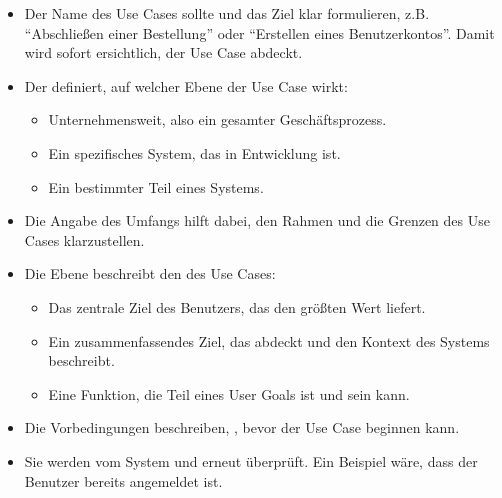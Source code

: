 \begin{infoBox}[title=Use Case Name]
    \begin{itemize}
        \item Der Name des Use Cases sollte  und das Ziel klar formulieren, z.B. \enquote{Abschließen einer Bestellung} oder \enquote{Erstellen eines Benutzerkontos}. Damit wird sofort ersichtlich,  der Use Case abdeckt.
    \end{itemize}
\end{infoBox}
\begin{infoBox}[title=Scope(Umfang)]
    \begin{itemize}
        \item Der  definiert, auf welcher Ebene der Use Case wirkt:
        \begin{itemize}
            \item {} Unternehmensweit, also ein gesamter Geschäftsprozess.
            \item {} Ein spezifisches System, das in Entwicklung ist.
            \item {} Ein bestimmter Teil eines Systems.
        \end{itemize}
        \item Die Angabe des Umfangs hilft dabei, den Rahmen und die Grenzen des Use Cases klarzustellen.
    \end{itemize}
\end{infoBox}
\begin{infoBox}[title=Level(Ebene)]
    \begin{itemize}
        \item Die Ebene beschreibt den  des Use Cases:
        \begin{itemize}
            \item {} Das zentrale Ziel des Benutzers, das den größten Wert liefert.
            \item {} Ein zusammenfassendes Ziel, das  abdeckt und den Kontext des Systems beschreibt.
            \item {} Eine Funktion, die Teil eines User Goals ist und  sein kann.
        \end{itemize}
    \end{itemize}
\end{infoBox}
\begin{infoBox}[title=Preconditions(Vorbedingungen)]
    \begin{itemize}
        \item Die Vorbedingungen beschreiben, , bevor der Use Case beginnen kann.
        \item Sie werden vom System  und  erneut überprüft. Ein Beispiel wäre, dass der Benutzer bereits angemeldet ist.
    \end{itemize}
\end{infoBox}

